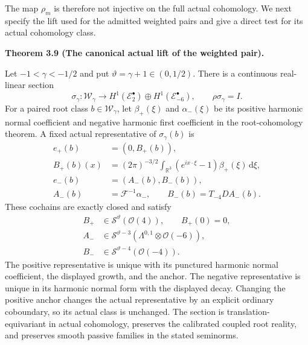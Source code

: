 \documentclass[
  english,
  11pt,
  reqno]{amsart}
\makeatletter
\newcommand{\pandocstatementheading}[1]{%
  \par\if@nobreak\else
    \addpenalty{\@beginparpenalty}%
    \addvspace{.5\baselineskip plus .2\baselineskip minus .2\baselineskip}%
  \fi
  {\normalfont\bfseries #1\par}%
  \nobreak\@afterindenttrue\@afterheading
}
\makeatother
\begin{document}
The map \(\rho_m\) is therefore not injective on the full actual
cohomology. We next specify the lift used for the admitted weighted
pairs and give a direct test for its actual cohomology class.

\pandocstatementheading{\leavevmode{}\label{thm:online-canonical-actual-pair-lift}Theorem 3.9 (The canonical actual lift of the weighted pair).}

Let \(-1<\gamma<-1/2\) and put \(\vartheta=\gamma+1\in(0,1/2)\). There
is a continuous real-linear section%
 \[
\sigma_\gamma:\mathscr W_\gamma
\longrightarrow
H^1(\mathscr E_2^\bullet)\oplus
H^1(\mathscr E_{-6}^\bullet),
\qquad \rho\sigma_\gamma=I.
\] For a paired root class \(b\in\mathscr W_\gamma\), let
\(\beta_+(\xi)\) and \(\alpha_-(\xi)\) be its positive harmonic normal
coefficient and negative harmonic first coefficient in the
root-cohomology theorem. A fixed actual representative of
\(\sigma_\gamma(b)\) is%
 \[
\begin{aligned}
e_+(b)&=(0,B_+(b)),\\
B_+(b)(x)&=(2\pi)^{-3/2}\int_{
\mathbb R^3}(e^{ix\cdot\xi}-1)\beta_+(\xi)\,\mathrm d\xi,\\
e_-(b)&=(A_-(b),B_-(b)),\\
A_-(b)&=\mathcal F^{-1}\alpha_-,
\qquad B_-(b)=T_{-4}D A_-(b).
\end{aligned}
\] These cochains are exactly closed and satisfy%
 \[
\begin{aligned}
B_+&\in\mathscr S^{\vartheta}(\mathcal O(4)),\qquad B_+(0)=0,\\
A_-&\in\mathscr S^{\vartheta-3}
(\Lambda^{0,1}\otimes\mathcal O(-6)),\\
B_-&\in\mathscr S^{\vartheta-4}(\mathcal O(-4)).
\end{aligned}
\] The positive representative is unique with its punctured harmonic
normal coefficient, the displayed growth, and the anchor. The negative
representative is unique in its harmonic normal form with the displayed
decay. Changing the positive anchor changes the actual representative by
an explicit ordinary coboundary, so its actual class is unchanged. The
section is translation-equivariant in actual cohomology, preserves the
calibrated coupled root reality, and preserves smooth passive families
in the stated seminorms.
\end{document}

